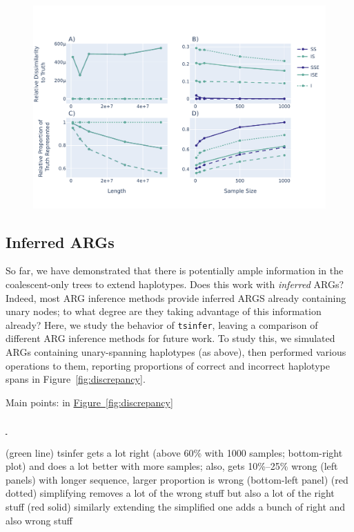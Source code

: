 \documentclass[10pt,twoside,lineno]{gsajnl}
\newcommand{\tsinfer}{\texttt{tsinfer}}
\newcommand*{\figref}[2][]{%
	\hyperref[{#2}]{%
		Figure~\ref*{#2}%
		\ifx\\#1\\%
		\else
		\,#1%
		\fi
	}%
}
\begin{document}
\begin{figure}
	\includegraphics{newplots_wo_ee/figure5.pdf}
\end{figure}



\subsection{Inferred ARGs}

So far, we have demonstrated that there is potentially ample information
in the coalescent-only trees to extend haplotypes.
Does this work with \emph{inferred} ARGs?
Indeed, most ARG inference methods provide inferred ARGS already containing unary nodes;
to what degree are they taking advantage of this information already?
Here, we study the behavior of \tsinfer{},
leaving a comparison of different ARG inference methods for future work.
To study this, we simulated ARGs containing unary-spanning haplotypes (as above),
then performed various operations to them,
reporting proportions of correct and incorrect haplotype spans in Figure~\ref{fig:discrepancy}.

Main points: in \figref{fig:discrepancy}
(green line) tsinfer gets a lot right (above 60\% with 1000 samples; bottom-right plot)
    and does a lot better with more samples;
    also, gets 10\%--25\% wrong (left panels)
    with longer sequence, larger proportion is wrong (bottom-left panel)
(red dotted)
    simplifying removes a lot of the wrong stuff
    but also a lot of the right stuff
(red solid)
    similarly extending the simplified one adds a bunch of right and also wrong stuff
    
\end{document}
